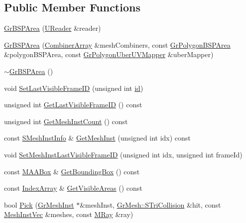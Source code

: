 \subsection*{Public Member Functions}
\begin{CompactItemize}
\item 
\hyperlink{class_gr_b_s_p_area_1917808ab54ae082c728ac4a7d227d51}{GrBSPArea} (\hyperlink{class_u_reader}{UReader} \&reader)
\item 
\hyperlink{class_gr_b_s_p_area_c3b18df6dd0993c841482ed39ebe78ee}{GrBSPArea} (\hyperlink{class_gr_b_s_p_area_31bece0da485709ff48572c457c2a3f4}{CombinerArray} \&meshCombiners, const \hyperlink{class_gr_polygon_b_s_p_area}{GrPolygonBSPArea} \&polygonBSPArea, const \hyperlink{class_gr_polygon_uber_u_v_mapper}{GrPolygonUberUVMapper} \&uberMapper)
\item 
\hyperlink{class_gr_b_s_p_area_89f1cd22f5fcfd2fad44188428bcddd2}{$\sim$GrBSPArea} ()
\item 
void \hyperlink{class_gr_b_s_p_area_2ff5711022e0a216c6cfee8620e29c40}{SetLastVisibleFrameID} (unsigned int \hyperlink{glext__bak_8h_58c2a664503e14ffb8f21012aabff3e9}{id})
\item 
unsigned int \hyperlink{class_gr_b_s_p_area_416ac8fc68f1298b3130e65aa363bfff}{GetLastVisibleFrameID} () const 
\item 
unsigned int \hyperlink{class_gr_b_s_p_area_034cbc677c55de0bd1111aa138d32c0d}{GetMeshInstCount} () const 
\item 
const \hyperlink{struct_gr_b_s_p_area_1_1_s_mesh_inst_info}{SMeshInstInfo} \& \hyperlink{class_gr_b_s_p_area_3036d2ce15275f657603deb0c553a75e}{GetMeshInst} (unsigned int idx) const 
\item 
void \hyperlink{class_gr_b_s_p_area_f6ab8deb86e82210eb489399ecdc5c5b}{SetMeshInstLastVisibleFrameID} (unsigned int idx, unsigned int frameId)
\item 
const \hyperlink{class_m_a_a_box}{MAABox} \& \hyperlink{class_gr_b_s_p_area_7e13e61ee1c244898bbbedb5edfbbdfa}{GetBoundingBox} () const 
\item 
const \hyperlink{class_gr_b_s_p_area_71a5e7cae58da5ccbce3662b378784ec}{IndexArray} \& \hyperlink{class_gr_b_s_p_area_19f3afae82383d85b1afce1119b9c01e}{GetVisibleAreas} () const 
\item 
bool \hyperlink{class_gr_b_s_p_area_9f8a64fe54421b7a44623384ec846477}{Pick} (\hyperlink{class_gr_mesh_inst}{GrMeshInst} $\ast$\&meshInst, \hyperlink{struct_gr_mesh_1_1_s_tri_collision}{GrMesh::STriCollision} \&hit, const \hyperlink{class_gr_b_s_p_area_ca3e4c6211c02064ec2d70b4f61738a8}{MeshInstVec} \&meshes, const \hyperlink{class_m_ray}{MRay} \&ray)

\end{CompactItemize}
